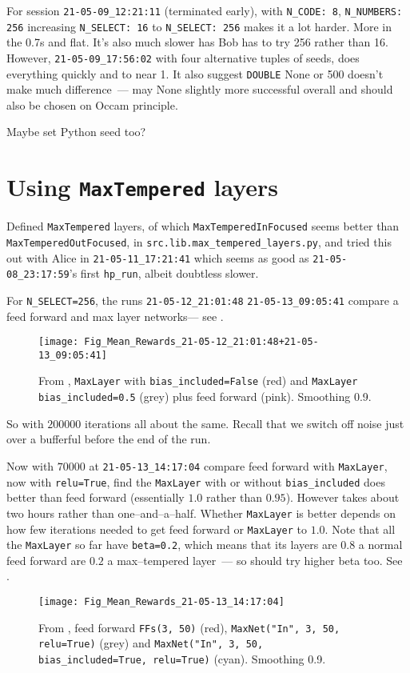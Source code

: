 \documentclass[12pt]{article}
\begin{document}
For session \verb|21-05-09_12:21:11| (terminated early), with \verb|N_CODE: 8|, \verb|N_NUMBERS: 256| increasing \verb|N_SELECT: 16| to \verb|N_SELECT: 256| makes it a lot harder. More in the 0.7s and flat. It's also much slower has Bob has to try 256 rather than 16.  However, \verb|21-05-09_17:56:02| with four alternative tuples of seeds, does everything quickly and to near 1.  It also suggest \verb|DOUBLE| None or 500 doesn't make much difference~--- may None slightly more successful overall and should also be chosen on Occam principle.

Maybe set Python seed too?


\section{Using \texttt{MaxTempered} layers}

Defined \verb|MaxTempered| layers, of which \verb|MaxTemperedInFocused| seems better than \verb|MaxTemperedOutFocused|, in \verb|src.lib.max_tempered_layers.py|, and tried this out with Alice in \verb|21-05-11_17:21:41| which seems as good as \verb|21-05-08_23:17:59|'s first \verb|hp_run|, albeit doubtless slower.

For \verb|N_SELECT=256|, the runs \verb|21-05-12_21:01:48| \verb|21-05-13_09:05:41| compare a feed forward and max layer networks--- see .
\begin{figure}
	\centering
	\texttt{[image: Fig\_Mean\_Rewards\_21-05-12\_21:01:48+21-05-13\_09:05:41]}
	\caption{From , \texttt{MaxLayer} with \texttt{bias\_included=False} (red) and \texttt{MaxLayer} \texttt{bias\_included=0.5} (grey) plus  feed forward (pink).  Smoothing 0.9.}
	\label{fig:figmeanrewards21-05-1221014821-05-13090541}
\end{figure}
So with $\num{200000}$ iterations all about the same.  Recall that we switch off noise just over a bufferful before the end of the run.

Now with $\num{70000}$ at \verb|21-05-13_14:17:04| compare feed forward with \verb|MaxLayer|, now with \verb|relu=True|, find the \verb|MaxLayer| with or without \verb|bias_included| does better than feed forward (essentially $1.0$ rather than $0.95$).  However takes about two hours rather than one--and--a--half.  Whether \verb|MaxLayer| is better depends on how few iterations needed to get feed forward or \verb|MaxLayer| to $1.0$.  Note that all the \verb|MaxLayer| so far have \verb|beta=0.2|, which means that its layers are $0.8$ a normal feed forward are $0.2$ a max--tempered layer~--- so should try higher beta too.  See .
\begin{figure}
	\centering
	\texttt{[image: Fig\_Mean\_Rewards\_21-05-13\_14:17:04]}
	\caption{From , feed forward \texttt{FFs(3, 50)} (red), \texttt{MaxNet("In", 3, 50, relu=True)} (grey) and \texttt{MaxNet("In", 3, 50, bias\_included=True, relu=True)} (cyan).  Smoothing 0.9.}
	\label{fig:figmeanrewards21-05-13141704}
\end{figure}
\end{document}
